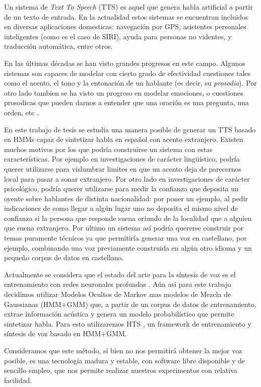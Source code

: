 Un sistema de \textit{Text To Speech} (TTS) es aquel que genera habla artificial a partir de un texto de entrada. En la actualidad estos sistemas se encuentran incluidos en diversas aplicaciones domesticas: navegación por GPS, asistentes personales inteligentes (como es el caso de SIRI), ayuda para personas no videntes, y traducción automática, entre otros.


En las últimas décadas se han visto grandes progresos en este campo. Algunos sistemas son capaces de modelar con cierto grado de efectividad cuestiones tales como el acento, el tono y la entonación de un hablante (es decir, su \textit{prosodia}). Por otro lado tambien se ha visto un progreso en modelar emociones, o cuestiones prosodicas que pueden darnos a entender que una oración es una pregunta, una orden, etc \cite{prosodiaYEntonacion} \cite{prosodiaYEntonacion2}. 


En este trabajo de tesis se estudia una manera posible de generar un TTS basado en HMMs capaz de sintetizar habla en español con acento extranjero. Existen muchos motivos por los que podría construirse un sistema con estas características. Por ejemplo en investigaciones de carácter lingüístico, podría querer utilizarse para vislumbrar limites en que un acento deja de parecernos local para pasar a sonar extranjero. Por otro lado en investigaciones de carácter psicológico, podría querer utilizarse para medir la confianza que deposita un oyente sobre hablantes de distinta nacionalidad: por poner un ejemplo, al pedir indicaciones de como llegar a algún lugar uno no deposita el mismo nivel de confianza si la persona que responde suena oriundo de la localidad que a alguien que suena extranjero. Por ultimo un sistema así podría quererse construir por temas puramente técnicos ya que permitiría generar una voz en castellano, por ejemplo, combinando una voz previamente construida en algún otro idioma y un pequeño corpus de datos en castellano.


Actualmente se considera que el estado del arte para la síntesis de voz es el entrenamiento con redes neuronales profundas \cite{redesProfundas} \cite{redesProfundas2}. Aún así para este trabajo decidimos utilizar Modelos Ocultos de Markov mas modelos de Mezcla de Gaussianas (HMM+GMM) que, a partir de un corpus de datos de entrenamiento, extrae información acústica y genera un modelo probabilístico que permite sintetizar habla. Para esto utilizaremos HTS \cite{hts}, un framework de entrenamiento y síntesis de voz basado en HMM+GMM.


Consideramos que este método, si bien no nos permitirá obtener la mejor voz posible, es una tecnología madura y estable, con software libre disponible y de sencillo empleo, que nos permite realizar nuestros experimentos con relativa facilidad.


